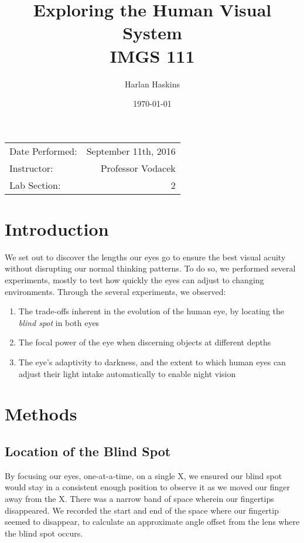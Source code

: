 \documentclass{article}
\title{Exploring the Human Visual System\\ IMGS 111}
\author{Harlan Haskins}
\date{\today}
\begin{document}
\maketitle

\begin{center}
\begin{tabular}{l r}
Date Performed: & September 11th, 2016 \\
Instructor: & Professor Vodacek \\
Lab Section: & 2
\end{tabular}
\end{center}

\pagebreak

\section{Introduction}
We set out to discover the lengths our eyes go to ensure the best visual acuity without disrupting our normal thinking patterns. To do so, we performed several experiments, mostly to test how quickly the eyes can adjust to changing environments.
Through the several experiments, we observed:
\begin{enumerate}
    \item The trade-offs inherent in the evolution of the human eye, by locating the \emph{blind spot} in both eyes
    \item The focal power of the eye when discerning objects at different depths
    \item The eye's adaptivity to darkness, and the extent to which human eyes can adjust their light intake automatically to enable night vision
\end{enumerate}

\section{Methods}
\subsection{Location of the Blind Spot}
By focusing our eyes, one-at-a-time, on a single X, we ensured our blind 
spot would stay in a consistent enough position to observe it as we
moved our finger away from the X. There was a narrow band of space wherein
our fingertips disappeared. We recorded the start and end of the space where
our fingertip seemed to disappear, to calculate an approximate angle offset
from the lens where the blind spot occurs.
\end{document}
